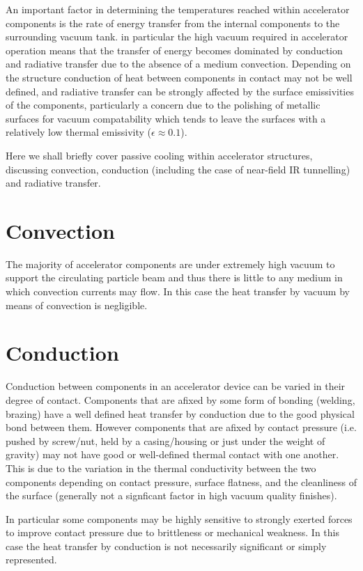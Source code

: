 \label{app:heatTransVac}

An important factor in determining the temperatures reached within accelerator components is the rate of energy transfer from the internal components to the surrounding vacuum tank. in particular the high vacuum required in accelerator operation means that the transfer of energy becomes dominated by conduction and radiative transfer due to the absence of a medium convection. Depending on the structure conduction of heat between components in contact may not be well defined, and radiative transfer can be strongly affected by the surface emissivities of the components, particularly a concern due to the polishing of metallic surfaces for vacuum compatability which tends to leave the surfaces with a relatively low thermal emissivity ($\epsilon \approx 0.1$).

Here we shall briefly cover passive cooling within accelerator structures, discussing convection, conduction (including the case of near-field IR tunnelling) and radiative transfer.

\section{Convection}

The majority of accelerator components are under extremely high vacuum to support the circulating particle beam and thus there is little to any medium in which convection currents may flow. In this case the heat transfer by vacuum by means of convection is negligible.

\section{Conduction}

Conduction between components in an accelerator device can be varied in their degree of contact. Components that are afixed by some form of bonding (welding, brazing) have a well defined heat transfer by conduction due to the good physical bond between them. However components that are afixed by contact pressure (i.e. pushed by screw/nut, held by a casing/housing or just under the weight of gravity) may not have good or well-defined thermal contact with one another. This is due to the variation in the thermal conductivity between the two components depending on contact pressure, surface flatness, and the cleanliness of the surface (generally not a signficant factor in high vacuum quality finishes).

In particular some components may be highly sensitive to strongly exerted forces to improve contact pressure due to brittleness or mechanical weakness. In this case the heat transfer by conduction is not necessarily significant or simply represented.

